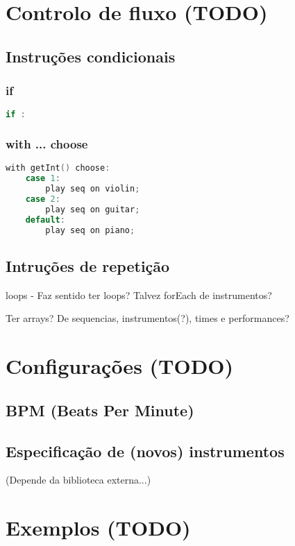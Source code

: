 \documentclass{article}
\begin{document}


\section{Controlo de fluxo (TODO)} \label{flux}
\subsection{Instruções condicionais}
\subsubsection{if}
\begin{lstlisting}[language=C]
if :
\end{lstlisting}

\subsubsection{with ... choose}
\begin{lstlisting}[language=C]
with getInt() choose:
    case 1:
        play seq on violin;
    case 2:
        play seq on guitar;
    default:
        play seq on piano;
\end{lstlisting}

\subsection{Intruções de repetição}
loops - Faz sentido ter loops? Talvez forEach de instrumentos?

Ter arrays? De sequencias, instrumentos(?), times e performances?


\section{Configurações (TODO)} \label{config}
\subsection{BPM (Beats Per Minute)}
\subsection{Especificação de (novos) instrumentos}
(Depende da biblioteca externa...)


\section{Exemplos (TODO)} \label{example}
\end{document}
